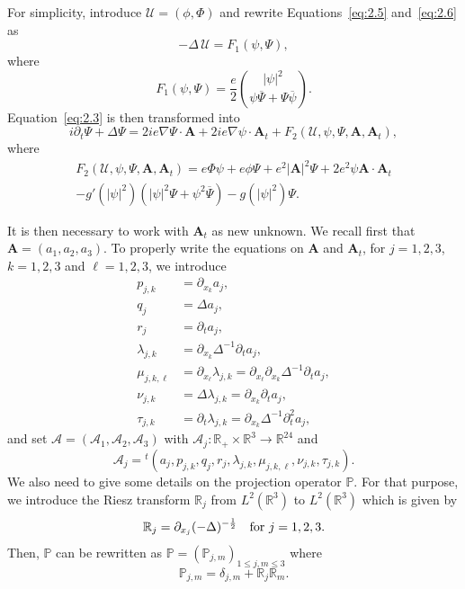 \documentclass[10pt]{amsart}
\theoremstyle{definition}\newtheorem{defi}[theo]{Definition}\newtheorem{rema}[theo]{Remark}\newtheorem{exam}[theo]{Example}\newtheorem{exem}[theo]{Example}\newtheorem{nota}[theo]{Notation}
\newcommand{\BA}{\mathbf{A}}
\newcommand{\R}{\mathbb{R}}
\begin{document}
For simplicity, introduce $\mathcal{U}=(\phi,\Phi)$ and rewrite Equations~\eqref{eq:2.5} and~\eqref{eq:2.6} as
\begin{equation}\label{eq:2.8}
-\Delta \, \mathcal{U} = F_1(\psi,\Psi),
\end{equation}
where
\[
F_1(\psi,\Psi)=\frac{e}{2}
\binom{|\psi |^2}{\psi \overline{\Psi}+\Psi \overline{\psi}}.
\]
Equation~\eqref{eq:2.3} is then transformed into
\begin{equation}\label{eq:2.9}
i\partial_t \Psi +\Delta \Psi = 2i e \nabla \Psi \cdot \BA +2ie \nabla\psi \cdot \BA_t +F_2(\mathcal{U},\psi,\Psi,\BA,\BA_t),
\end{equation}
where
\begin{multline*}
F_2(\mathcal{U},\psi,\Psi,\BA,\BA_t) = e\Phi\psi +e\phi\Psi +e^2| \BA |^2\Psi +2e^2 \psi \BA\cdot \BA_t \\
-g'(|\psi|^2)(|\psi|^2\Psi+\psi^2\overline{\Psi})-g(|\psi|^2)\Psi.
\end{multline*}

It is then necessary to work with $\BA_t$ as new unknown. We recall first that $\BA=(a_1,a_2,a_3)$. To properly write the equations on $\BA$ and $\BA_t$, for $j=1,2,3$, $k=1,2,3$ and $\ell=1,2,3$, we introduce
\begin{align*}
p_{j,k}&= \partial_{x_k} a_j, \\
q_j&= \Delta a_j, \\
r_j&= \partial_t a_j, \\
\lambda_{j,k} &= \partial_{x_k} \Delta^{-1} \partial_t a_j, \\
\mu_{j,k,\ell} &= \partial_{x_\ell} \lambda_{j,k} = \partial_{x_\ell} \partial_{x_k} \Delta^{-1} \partial_t a_j, \\
\nu_{j,k}&= \Delta \lambda_{j,k}= \partial_{x_k} \partial_t a_j,\\
\tau_{j,k}&= \partial_t \lambda_{j,k}= \partial_{x_k} \Delta^{-1} \partial_t^2 a_j,
\end{align*}
and set $\mathcal{A}=(\mathcal{A}_1, \mathcal{A}_2, \mathcal{A}_3)$ with $\mathcal{A}_j: \R_+ \times \R^3 \to \R^{24}$ and
\[
\mathcal{A}_j={}^t
(a_j, p_{j,k}, q_j, r_j, \lambda_{j,k}, \mu_{j,k,\ell}, \nu_{j,k}, \tau_{j,k}).
\]
We also need to give some details on the projection operator ${\mathbb P}$. For that purpose, we introduce the Riesz transform ${\mathbb R}_j$ from $L^2(\R^3)$ to $L^2(\R^3)$ which is given by
\[
{\mathbb R}_j= \partial_{x_j} (-\Delta)^{-\frac{1}{2}} \quad \hbox{for} \ j=1,2,3.
\]
Then, ${\mathbb P}$ can be rewritten as ${\mathbb P}=({\mathbb P}_{j,m})_{1\leq j,m\leq 3}$ where
\[
{\mathbb P}_{j,m} =\delta_{j,m} +{\mathbb R}_j {\mathbb R}_m.
\]
\end{document}
